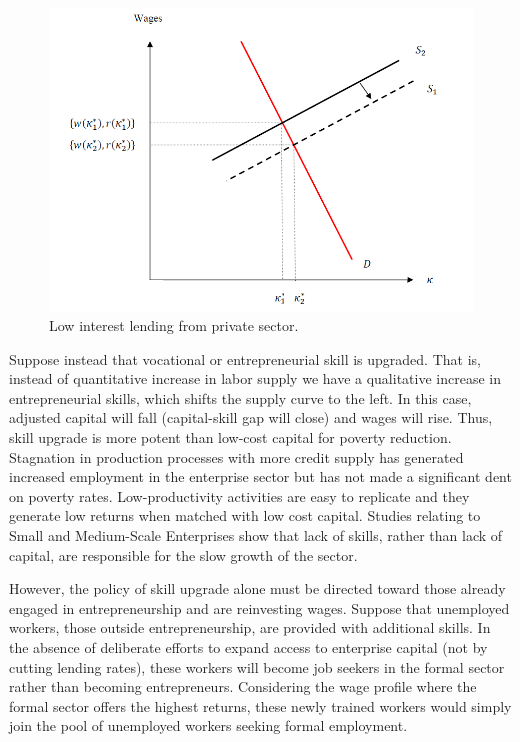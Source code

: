 \documentclass[
  a4paper,
  DIV=11,
  numbers=noendperiod]{scrartcl}
\begin{document}
\begin{figure}

{\centering \includegraphics{figures/figure-13.png}

}

\caption{\label{fig-figure-13}Low interest lending from private sector.}

\end{figure}

Suppose instead that vocational or entrepreneurial skill is upgraded.
That is, instead of quantitative increase in labor supply we have a
qualitative increase in entrepreneurial skills, which shifts the supply
curve to the left. In this case, adjusted capital will fall
(capital-skill gap will close) and wages will rise. Thus, skill upgrade
is more potent than low-cost capital for poverty reduction. Stagnation
in production processes with more credit supply has generated increased
employment in the enterprise sector but has not made a significant dent
on poverty rates. Low-productivity activities are easy to replicate and
they generate low returns when matched with low cost capital. Studies
relating to Small and Medium-Scale Enterprises show that lack of skills,
rather than lack of capital, are responsible for the slow growth of the
sector.

However, the policy of skill upgrade alone must be directed toward those
already engaged in entrepreneurship and are reinvesting wages. Suppose
that unemployed workers, those outside entrepreneurship, are provided
with additional skills. In the absence of deliberate efforts to expand
access to enterprise capital (not by cutting lending rates), these
workers will become job seekers in the formal sector rather than
becoming entrepreneurs. Considering the wage profile where the formal
sector offers the highest returns, these newly trained workers would
simply join the pool of unemployed workers seeking formal employment.
\end{document}
